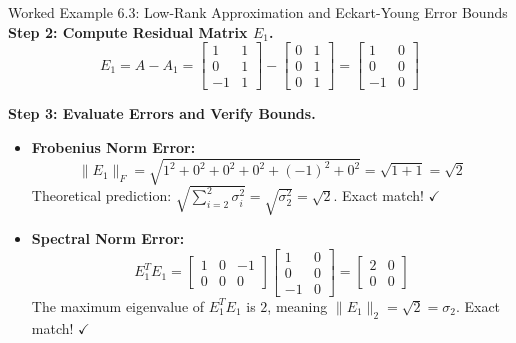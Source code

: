 \begin{examplebox}[breakable]{Worked Example 6.3: Low-Rank Approximation and Eckart-Young Error Bounds}
\textbf{Step 2: Compute Residual Matrix $E_1$.}
\begin{equation}
E_1 = A - A_1 = \begin{bmatrix} 1 & 1 \\ 0 & 1 \\ -1 & 1 \end{bmatrix} - \begin{bmatrix} 0 & 1 \\ 0 & 1 \\ 0 & 1 \end{bmatrix} = \begin{bmatrix} 1 & 0 \\ 0 & 0 \\ -1 & 0 \end{bmatrix}
\end{equation}

\textbf{Step 3: Evaluate Errors and Verify Bounds.}
\begin{itemize}
    \item \textbf{Frobenius Norm Error:}
    \begin{equation}
    \|E_1\|_F = \sqrt{1^2 + 0^2 + 0^2 + 0^2 + (-1)^2 + 0^2} = \sqrt{1 + 1} = \sqrt{2}
    \end{equation}
    Theoretical prediction: $\sqrt{\sum_{i=2}^2 \sigma_i^2} = \sqrt{\sigma_2^2} = \sqrt{2}$. Exact match! $\checkmark$
    \item \textbf{Spectral Norm Error:}
    \begin{equation}
    E_1^T E_1 = \begin{bmatrix} 1 & 0 & -1 \\ 0 & 0 & 0 \end{bmatrix} \begin{bmatrix} 1 & 0 \\ 0 & 0 \\ -1 & 0 \end{bmatrix} = \begin{bmatrix} 2 & 0 \\ 0 & 0 \end{bmatrix}
    \end{equation}
    The maximum eigenvalue of $E_1^T E_1$ is $2$, meaning $\|E_1\|_2 = \sqrt{2} = \sigma_2$. Exact match! $\checkmark$
\end{itemize}
\end{examplebox}

